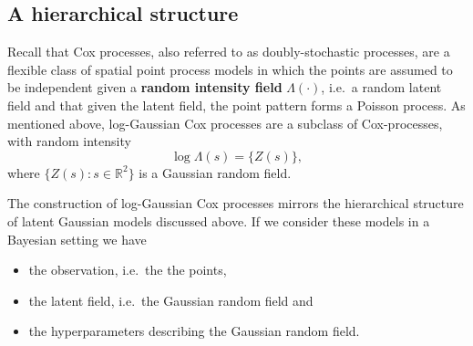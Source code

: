 \subsection{A hierarchical structure}
Recall that Cox processes, also referred to as  doubly-stochastic processes, are a flexible class of spatial point process
models in which the points are assumed to be independent given a \textbf{random intensity field} $\Lambda(\cdot)$, i.e.\ a random latent field and that given the latent field, the point pattern forms a Poisson process. 
As mentioned above, log-Gaussian Cox processes are a subclass of Cox-processes,  with random intensity
$$\log \Lambda(s)=\{{Z} (s)\},$$
where $\{{Z}(s): s\in \mathbb{R}^2 \}$ is a Gaussian random field.

The construction of log-Gaussian Cox processes mirrors the hierarchical structure of latent Gaussian models discussed above. If we consider these models in a Bayesian setting we have
\begin{itemize}
\item the observation, i.e.\ the  the points,
\item the latent field, i.e.\ the Gaussian random field and
\item the hyperparameters describing the Gaussian random field.
\end{itemize}






